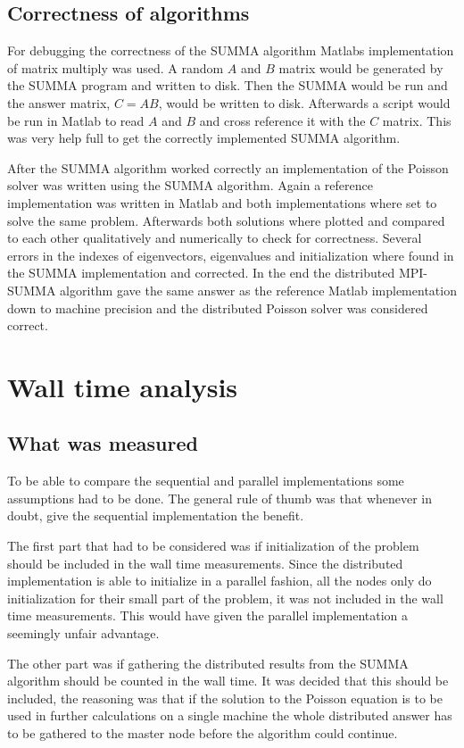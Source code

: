 \documentclass{article}
\begin{document}
\subsection{Correctness of algorithms}
For debugging the correctness of the SUMMA algorithm Matlabs implementation of
matrix multiply was used. A random $A$ and $B$ matrix would be generated by the
SUMMA program and written to disk. Then the SUMMA would be run and the
answer matrix, $C = A B$, would be written to disk. Afterwards a script would be
run in Matlab to read $A$ and $B$ and cross reference it with the $C$ matrix.
This was very help full to get the correctly implemented SUMMA algorithm.

After the SUMMA algorithm worked correctly an implementation of the Poisson solver
was written using the SUMMA algorithm. Again a reference implementation was written
in Matlab and both implementations where set to solve the same problem. Afterwards
both solutions where plotted and compared to each other qualitatively and numerically
to check for correctness. Several errors in the indexes of eigenvectors, eigenvalues
and initialization where found in the SUMMA implementation and corrected. In the end
the distributed MPI-SUMMA algorithm gave the same answer as the reference Matlab implementation
down to machine precision and the distributed Poisson solver was considered correct.

\section{Wall time analysis}

\subsection{What was measured}
To be able to compare the sequential and parallel implementations some assumptions had to
be done. The general rule of thumb was that whenever in doubt, give the sequential implementation
the benefit.

The first part that had to be considered was if initialization of the problem should be included
in the wall time measurements. Since the distributed implementation is able to initialize in
a parallel fashion, all the nodes only do initialization for their small part of the
problem, it was not included in the wall time measurements. This would have given the parallel implementation
a seemingly unfair advantage.

The other part was if gathering the distributed results from the SUMMA algorithm
should be counted in the wall time. It was decided that this should be included,
the reasoning was that if the solution to the Poisson equation is to be used in
further calculations on a single machine the whole distributed answer has to be
gathered to the master node before the algorithm could continue.
\end{document}

